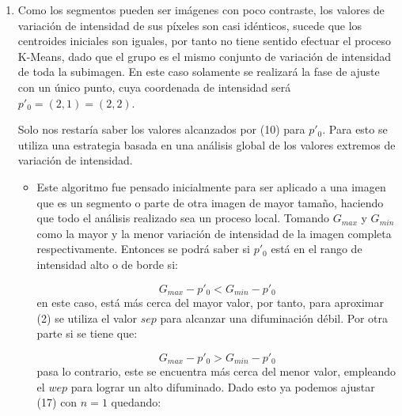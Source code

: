 \documentclass[a4paper,10pt,twocolumn]{article}
\begin{document}
\begin{enumerate}
Esta \'ultima muestra los valores intermedios buscados en KMMC. Ya con esta conversi\'on de la versi\'on antigua a la nueva, podemos continuar en el algoritmo original.
Si hacemos $p_2 = p'_2$  donde $p'_2$ es el menor valor del conjunto $P'_2$ y $p_3 = p'_3$ ya que $p'_3$ es tambi\'en el menor valor del grupo $P'_3$. Por tanto es posible concluir de que el nuevo algoritmo toma como valores de variaci\'on de intensidad para ajustar la funci\'on a las medias o centroides de los grupos que en el mismo se define.

\item  Como los segmentos pueden ser im\'agenes con poco contraste, los valores de variaci\'on de intensidad de sus p\'ixeles son casi id\'enticos, sucede que los centroides iniciales son iguales, por tanto no tiene sentido efectuar el proceso K-Means, dado que el grupo es el mismo conjunto de variaci\'on de intensidad de toda la subimagen. En este caso solamente se realizar\'a la fase de ajuste con un \'unico punto, cuya coordenada de intensidad ser\'a $p'_0 = (2,1) = (2,2)$.

Solo nos restar\'ia saber los valores alcanzados por (10) para $p'_0$. Para esto se utiliza una estrategia basada en una an\'alisis global de los valores extremos de variaci\'on de intensidad.

\begin{itemize} 
\item Este algoritmo fue pensado inicialmente para ser aplicado a una imagen que es un segmento o parte de otra imagen de mayor tama\~no, haciendo que todo el an\'alisis realizado sea un proceso local. Tomando $G_{max}$ y $G_{min}$ como la mayor y la menor variaci\'on de intensidad de la imagen completa respectivamente. Entonces se podr\'a saber si $p'_0$ est\'a en el rango de intensidad alto o de borde si:

\begin{equation}
	G_{max} - p'_0 < G_{min} - p'_0
\end{equation}
en este caso, est\'a m\'as cerca del mayor valor, por tanto, para aproximar (2) se utiliza el valor $sep$ para alcanzar una difuminaci\'on d\'ebil. Por otra parte si se tiene que:

\begin{equation}
	G_{max} - p'_0 > G_{min} - p'_0
\end{equation}
pasa lo contrario, este se encuentra m\'as cerca del menor valor, empleando el $wep$ para lograr un alto difuminado. Dado esto ya podemos ajustar (17) con $n=1$ quedando:


\end{itemize}
\end{enumerate}
\end{document}
